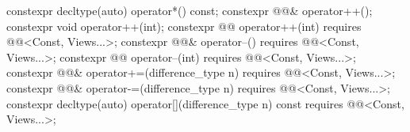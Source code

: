 \begin{codeblock}
{{    constexpr decltype(auto) operator*() const;
    constexpr @@& operator++();
    constexpr void operator++(int);
    constexpr @@ operator++(int)
      requires @@<Const, Views...>;
    constexpr @@& operator--()
      requires @@<Const, Views...>;
    constexpr @@ operator--(int)
      requires @@<Const, Views...>;
    constexpr @@& operator+=(difference_type n)
      requires @@<Const, Views...>;
    constexpr @@& operator-=(difference_type n)
      requires @@<Const, Views...>;
    constexpr decltype(auto) operator[](difference_type n) const
      requires @@<Const, Views...>;

}}
\end{codeblock}
